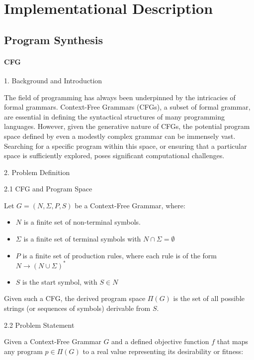 \chapter{Implementational Description}





\section{Program Synthesis}

\subsubsection{CFG}

1. Background and Introduction

The field of programming has always been underpinned by the intricacies of formal grammars. Context-Free Grammars (CFGs), a subset of formal grammar, are essential in defining the syntactical structures of many programming languages. However, given the generative nature of CFGs, the potential program space defined by even a modestly complex grammar can be immensely vast. Searching for a specific program within this space, or ensuring that a particular space is sufficiently explored, poses significant computational challenges.

2. Problem Definition

2.1 CFG and Program Space

Let \( G = (N, \Sigma, P, S) \) be a Context-Free Grammar, where:
\begin{itemize}
    \item \( N \) is a finite set of non-terminal symbols.
    \item \( \Sigma \) is a finite set of terminal symbols with \newline \( N \cap \Sigma = \emptyset \)
    \item \( P \) is a finite set of production rules, where each rule is of the form \( N \rightarrow (N \cup \Sigma)^* \)
    \item \( S \) is the start symbol, with \( S \in N \)
\end{itemize}

Given such a CFG, the derived program space \( \Pi(G) \) is the set of all possible strings (or sequences of symbols) derivable from \( S \).

2.2 Problem Statement

Given a Context-Free Grammar \( G \) and a defined objective function \( f \) that maps any program \( p \in \Pi(G) \) to a real value representing its desirability or fitness:

